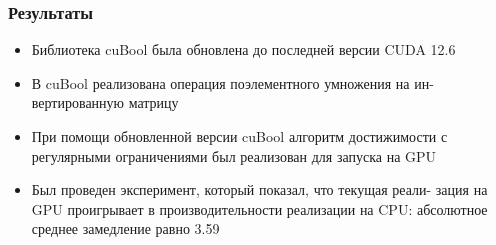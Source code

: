 \documentclass{beamer}
\begin{document}
\begin{frame}
  \frametitle{Результаты}

\begin{itemize}
    \item Библиотека cuBool была обновлена до последней версии CUDA
12.6
    \item В cuBool реализована операция поэлементного умножения на ин-
вертированную матрицу
    \item При помощи обновленной версии cuBool алгоритм достижимости
с регулярными ограничениями был реализован для запуска на
GPU
    \item Был проведен эксперимент, который показал, что текущая реали-
зация на GPU проигрывает в производительности реализации на
CPU: абсолютное среднее замедление равно 3.59
\end{itemize}


\end{frame}
\end{document}
